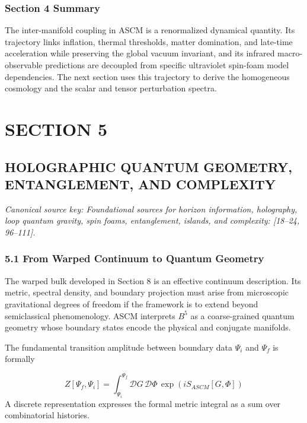 \documentclass[aps,prd,onecolumn,superscriptaddress,nofootinbib,longbibliography,10pt]{revtex4-2}
\begin{document}
  
\subsubsection*{Section 4 Summary}

  The inter-manifold coupling in ASCM is a renormalized dynamical quantity. Its trajectory links inflation, thermal thresholds, matter domination, and late-time acceleration while preserving the global vacuum invariant, and its infrared macro-observable predictions are decoupled from specific ultraviolet spin-foam model dependencies. The next section uses this trajectory to derive the homogeneous cosmology and the scalar and tensor perturbation spectra.




 

  
\section*{SECTION 5}

  
\subsection*{HOLOGRAPHIC QUANTUM GEOMETRY, ENTANGLEMENT, AND COMPLEXITY}

  \textit{Canonical source key: Foundational sources for horizon information, holography, loop quantum gravity, spin foams, entanglement, islands, and complexity: [18–24, 96–111].}


  
\subsubsection*{5.1 From Warped Continuum to Quantum Geometry}

  The warped bulk developed in Section 8 is an effective continuum description. Its metric, spectral density, and boundary projection must arise from microscopic gravitational degrees of freedom if the framework is to extend beyond semiclassical phenomenology. ASCM interprets \(B^5\) as a coarse-grained quantum geometry whose boundary states encode the physical and conjugate manifolds.


  The fundamental transition amplitude between boundary data \(\Psi_i\) and \(\Psi_f\) is formally


  \[ Z[\Psi_f, \Psi_i] = \int_{\Psi_i}^{\Psi_f} \mathcal{D}G\,\mathcal{D}\Phi\,\exp(i S_{ASCM}[G,\Phi]) \]
  A discrete representation expresses the formal metric integral as a sum over combinatorial histories.
\end{document}
